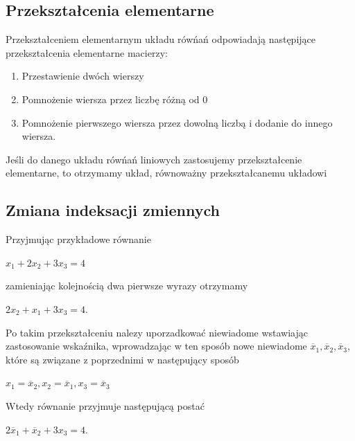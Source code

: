\documentclass{article}
\begin{document}
\subsection{Przekształcenia elementarne}\label{Przekształcenia elementarne}
Przekształceniem elementarnym układu rówńań odpowiadają następijące przekształcenia elementarne macierzy:
\begin{enumerate}
    \item Przestawienie dwóch wierszy
    \item Pomnożenie wiersza przez liczbę różną od 0
    \item Pomnożenie pierwszego wiersza przez dowolną liczbą i dodanie do innego wiersza.
\end{enumerate}
Jeśli do danego układu rówńań liniowych zastosujemy przekształcenie elementarne, to otrzymamy układ, równoważny przekształcanemu układowi
\subsection{Zmiana indeksacji zmiennych}
Przyjmując przykładowe równanie 
\begin{center}
    \begin{math}
x_{1}+2x_{2}+3x_{3} = 4
\end{math}
\end{center}
 zamieniając kolejnością dwa pierwsze wyrazy otrzymamy 
\begin{center}
    \begin{math}
2x_{2}+x_{1}+3x_{3} = 4
\end{math}.
\end{center}
Po takim przekształceniu nalezy uporzadkować niewiadome wstawiając zastosowanie wskaźnika, wprowadzając w ten sposób nowe niewiadome \begin{math}\overline{x}_{1}, \overline{x}_{2}, \overline{x}_{3}\end{math}, które są związane z poprzednimi w następujący sposób
\begin{center}
    \begin{math}
    x_{1} = \overline{x}_{2}, x_{2} =\overline{x}_{1}, x_{3} =\overline{x}_{3}
    \end{math}
\end{center}
Wtedy równanie przyjmuje następującą postać 
\begin{center}
    \begin{math}
2\overline{x}_{1}+\overline{x}_{2}+3x_{3} = 4
\end{math}.
\end{center}
\newpage
\end{document}
